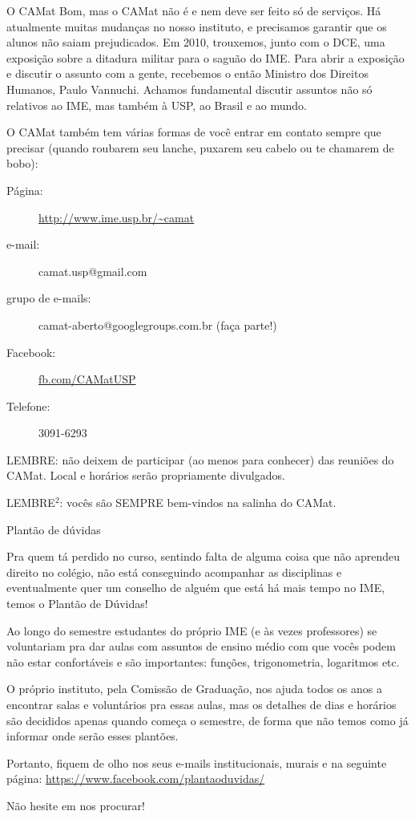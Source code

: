 \begin{secao}{O CAMat}
Bom, mas o CAMat não é e nem deve ser feito só de serviços. Há atualmente
muitas mudanças no nosso instituto, e precisamos garantir que os alunos não
saiam prejudicados. Em 2010, trouxemos, junto com o
DCE, uma exposição sobre a ditadura militar para o saguão do IME. Para abrir a
exposição e discutir o assunto com a gente, recebemos o então Ministro dos
Direitos Humanos, Paulo Vannuchi. Achamos fundamental discutir assuntos não só
relativos ao IME, mas também à USP, ao Brasil e ao mundo.

O CAMat também tem várias formas de você entrar em contato sempre que precisar
(quando roubarem seu lanche, puxarem seu cabelo ou te chamarem de bobo):

\begin{description}
\item [Página:] \url{http://www.ime.usp.br/~camat}
\item [e-mail:] camat.usp@gmail.com
\item [grupo de e-mails:] camat-aberto@googlegroups.com.br (faça parte!)
\item [Facebook:] \url{fb.com/CAMatUSP}
\item [Telefone:] 3091-6293
\end{description}

LEMBRE: não deixem de participar (ao menos para conhecer) das reuniões do
CAMat. Local e horários serão propriamente divulgados.

LEMBRE$^2$: vocês são SEMPRE bem-vindos na salinha do CAMat.

\begin{subsecao}{Plantão de dúvidas}

Pra quem tá perdido no curso, sentindo falta de alguma coisa que não aprendeu
direito no colégio, não está conseguindo acompanhar as disciplinas e
eventualmente quer um conselho de alguém que está há mais tempo no IME, temos o
Plantão de Dúvidas!

Ao longo do semestre estudantes do próprio IME (e às vezes professores) se
voluntariam pra dar aulas com assuntos de ensino médio com que vocês podem não
estar confortáveis e são importantes: funções, trigonometria, logaritmos etc.

O próprio instituto, pela Comissão de Graduação, nos ajuda todos os anos a
encontrar salas e voluntários pra essas aulas, mas os detalhes de dias e
horários são decididos apenas quando começa o semestre, de forma que não temos
como já informar onde serão esses plantões.

Portanto, fiquem de olho nos seus e-mails institucionais, murais e na seguinte
página: \url{https://www.facebook.com/plantaoduvidas/}

Não hesite em nos procurar!

\end{subsecao}

\end{secao}
